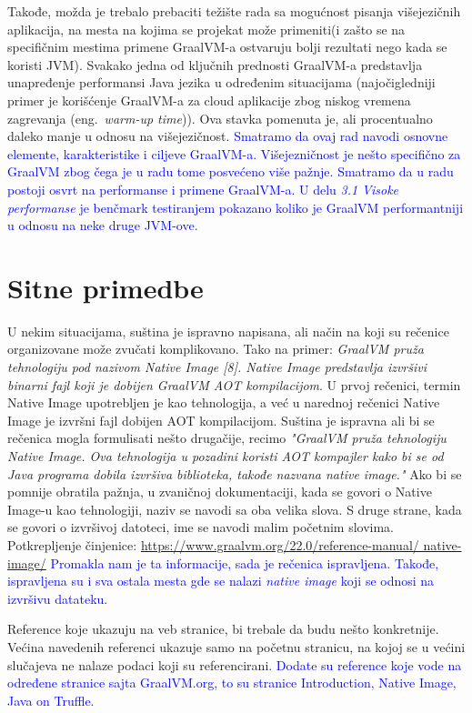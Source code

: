 \documentclass[a4paper]{report}
\newcommand{\odgovor}[1]{\textcolor{blue}{#1}}
\begin{document}
Takođe, možda je trebalo prebaciti težište rada sa mogućnost pisanja višejezičnih aplikacija, na mesta na kojima se projekat može primeniti(i 
zašto se na specifičnim mestima primene GraalVM-a ostvaruju bolji rezultati nego kada se koristi JVM). Svakako jedna od ključnih prednosti 
GraalVM-a predstavlja unapređenje performansi Java jezika u određenim situacijama (najočigledniji primer je korišćenje GraalVM-a za cloud 
aplikacije zbog niskog vremena zagrevanja (eng.~{\em warm-up time})). Ova stavka pomenuta je, ali procentualno daleko manje u odnosu na 
višejezičnost.
\odgovor{Smatramo da ovaj rad navodi osnovne elemente, karakteristike i ciljeve GraalVM-a. Višejezničnost je nešto specifično za GraalVM zbog čega je u radu tome posvećeno više pažnje. Smatramo da u radu postoji osvrt na performanse i primene GraalVM-a. U delu \emph{3.1 Visoke performanse} je benčmark testiranjem pokazano koliko je GraalVM performantniji u odnosu na neke druge JVM-ove.}

\section{Sitne primedbe}
U nekim situacijama, suština je ispravno napisana, ali način na koji su rečenice organizovane može zvučati komplikovano. Tako na primer: 
\textit{GraalVM pruža tehnologiju pod nazivom Native Image [8]. Native Image predstavlja izvršivi binarni fajl koji je dobijen GraalVM AOT 
kompilacijom}. U prvoj rečenici, termin Native Image upotrebljen je kao tehnologija, a već u narednoj rečenici Native Image je izvršni fajl 
dobijen AOT kompilacijom. Suština je ispravna ali bi se rečenica mogla formulisati nešto drugačije, recimo \textit{"GraalVM pruža tehnologiju 
Native Image. Ova tehnologija u pozadini koristi AOT kompajler kako bi se od Java programa dobila izvršiva biblioteka, takođe nazvana native 
image."} Ako bi se pomnije obratila pažnja, u zvaničnoj dokumentaciji, kada se govori o Native Image-u kao tehnologiji, naziv se navodi sa oba 
velika slova. S druge strane, kada se govori o izvršivoj datoteci, ime se navodi malim početnim slovima. 
Potkrepljenje činjenice: \href{https://www.graalvm.org/22.0/reference-manual/native-image/}{https://www.graalvm.org/22.0/reference-manual/
native-image/} \odgovor{Promakla nam je ta informacije, sada je rečenica ispravljena. Takođe, ispravljena su i sva ostala mesta gde se nalazi \emph{native image} koji se odnosi na izvršivu datateku.}

\indent Reference koje ukazuju na veb stranice, bi trebale da budu nešto konkretnije. Većina navedenih referenci ukazuje samo na početnu stranicu, na kojoj se u većini slučajeva ne nalaze podaci koji su referencirani.  \odgovor{Dodate su reference koje vode na određene stranice sajta GraalVM.org, to su stranice Introduction, Native Image, Java on Truffle.}
\end{document}
